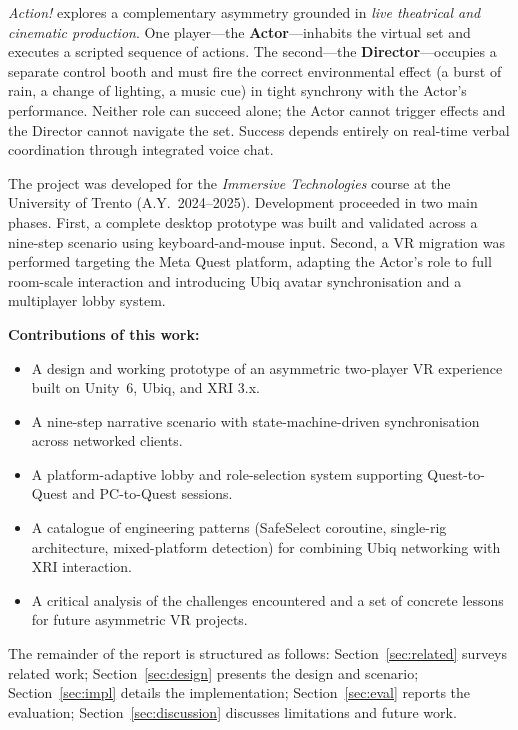 \documentclass[12pt,a4paper]{article}
\begin{document}
\textit{Action!} explores a complementary asymmetry grounded in \emph{live theatrical and cinematic production}. One player---the \textbf{Actor}---inhabits the virtual set and executes a scripted sequence of actions. The second---the \textbf{Director}---occupies a separate control booth and must fire the correct environmental effect (a burst of rain, a change of lighting, a music cue) in tight synchrony with the Actor's performance. Neither role can succeed alone; the Actor cannot trigger effects and the Director cannot navigate the set. Success depends entirely on real-time verbal coordination through integrated voice chat.

The project was developed for the \textit{Immersive Technologies} course at the University of Trento (A.Y.\ 2024--2025). Development proceeded in two main phases. First, a complete desktop prototype was built and validated across a nine-step scenario using keyboard-and-mouse input. Second, a VR migration was performed targeting the Meta Quest platform, adapting the Actor's role to full room-scale interaction and introducing Ubiq avatar synchronisation and a multiplayer lobby system.

\medskip
\noindent\textbf{Contributions of this work:}
\begin{itemize}[leftmargin=1.8em, itemsep=2pt]
  \item A design and working prototype of an asymmetric two-player VR experience built on Unity~6, Ubiq, and XRI 3.x.
  \item A nine-step narrative scenario with state-machine-driven synchronisation across networked clients.
  \item A platform-adaptive lobby and role-selection system supporting Quest-to-Quest and PC-to-Quest sessions.
  \item A catalogue of engineering patterns (SafeSelect coroutine, single-rig architecture, mixed-platform detection) for combining Ubiq networking with XRI interaction.
  \item A critical analysis of the challenges encountered and a set of concrete lessons for future asymmetric VR projects.
\end{itemize}

\medskip
The remainder of the report is structured as follows: Section~\ref{sec:related} surveys related work; Section~\ref{sec:design} presents the design and scenario; Section~\ref{sec:impl} details the implementation; Section~\ref{sec:eval} reports the evaluation; Section~\ref{sec:discussion} discusses limitations and future work.
\end{document}
